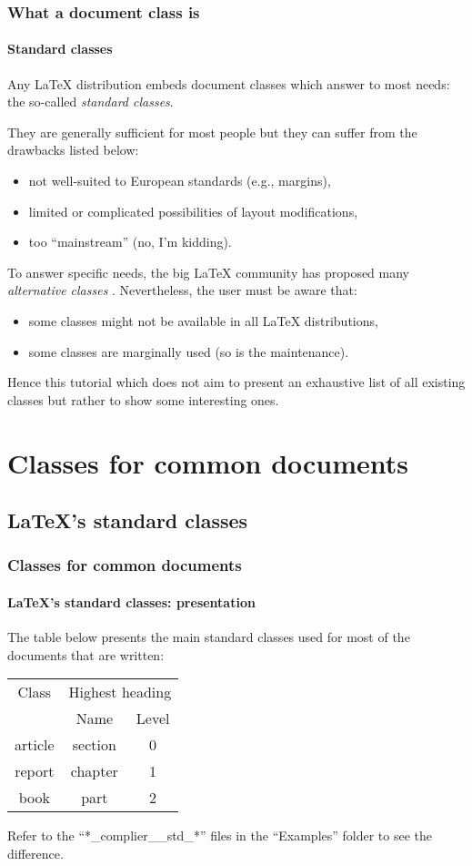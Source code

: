 \documentclass[11pt]{beamer}
\begin{document}
\begin{frame}
	\frametitle{What a document class is}
	\framesubtitle{Standard classes}
	
	Any \LaTeX{} distribution embeds document classes which answer to most needs: the so-called \emph{standard classes}.
	
	They are generally sufficient for most people but they can suffer from the drawbacks listed below:
	\begin{itemize}
		\item not well-suited to European standards (e.g., margins),
		\item limited or complicated possibilities of layout modifications,
		\item too \enquote{mainstream} (no, I'm kidding).
	\end{itemize}


	To answer specific needs, the big \LaTeX{} community has proposed many \emph{alternative classes} \cite{CTAN_Class}.
	Nevertheless, the user must be aware that:
	\begin{itemize}
		\item some classes might not be available in all \LaTeX{} distributions,
		\item some classes are marginally used (so is the maintenance).
	\end{itemize}

	Hence this tutorial which does not aim to present an exhaustive list of all existing classes but rather to show some interesting ones.
\end{frame}


\section{Classes for common documents}


	\subsection{\LaTeX{}'s standard classes}
	

\begin{frame}
	\frametitle{Classes for common documents}
	\framesubtitle{\LaTeX{}'s standard classes: presentation}
	
	The table below presents the main standard classes used for most of the documents that are written:
	\begin{table}[h]
		\begin{tabular}{*{3}{c}}
			\toprule
			 Class  & \multicolumn{2}{c}{Highest heading} \\ \cmidrule{2-3}
			        &      Name       &     Level     \\ \midrule
			article &     section     &       0       \\
			report  &     chapter     &       1       \\
			 book   &      part       &       2       \\ \bottomrule
		\end{tabular}
	\end{table}
	Refer to the \enquote{*\_complier\_\_std\_*} files in the \enquote{Examples} folder to see the difference.
\end{frame}
\end{document}

